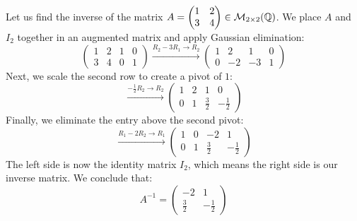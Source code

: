 \begin{example}
Let us find the inverse of the matrix $A = \begin{pmatrix} 1 & 2 \\ 3 & 4 \end{pmatrix} \in \mathcal{M}_{2 \times 2}(\mathbb{Q})$. We place $A$ and $I_2$ together in an augmented matrix and apply Gaussian elimination:
\begin{equation*}
    \left( \begin{array}{cc|cc} 1 & 2 & 1 & 0 \\ 3 & 4 & 0 & 1 \end{array} \right) \xrightarrow{R_2 - 3R_1 \longrightarrow R_2} \left( \begin{array}{cc|cc} 1 & 2 & 1 & 0 \\ 0 & -2 & -3 & 1 \end{array} \right)
\end{equation*}
Next, we scale the second row to create a pivot of $1$:
\begin{equation*}
    \xrightarrow{-\frac{1}{2}R_2 \longrightarrow R_2} \left( \begin{array}{cc|cc} 1 & 2 & 1 & 0 \\ 0 & 1 & \frac{3}{2} & -\frac{1}{2} \end{array} \right)
\end{equation*}
Finally, we eliminate the entry above the second pivot:
\begin{equation*}
    \xrightarrow{R_1 - 2R_2 \longrightarrow R_1} \left( \begin{array}{cc|cc} 1 & 0 & -2 & 1 \\ 0 & 1 & \frac{3}{2} & -\frac{1}{2} \end{array} \right)
\end{equation*}
The left side is now the identity matrix $I_2$, which means the right side is our inverse matrix. We conclude that:
\begin{equation*}
    A^{-1} = \begin{pmatrix} -2 & 1 \\ \frac{3}{2} & -\frac{1}{2} \end{pmatrix}
\end{equation*}
\end{example}